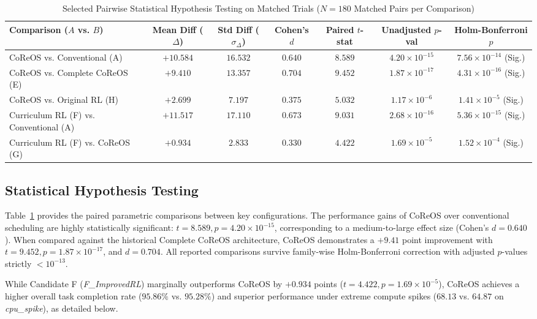 \documentclass[conference]{IEEEtran}
\begin{document}
\begin{table}[!t]
\caption{Selected Pairwise Statistical Hypothesis Testing on Matched Trials ($N=180$ Matched Pairs per Comparison)}
\label{tab:statistical_tests}
\centering
\footnotesize
\begin{tabular}{lcccccc}
\toprule
\textbf{Comparison ($A$ vs. $B$)} & \textbf{Mean Diff ($\Delta$)} & \textbf{Std Diff ($\sigma_\Delta$)} & \textbf{Cohen's $d$} & \textbf{Paired $t$-stat} & \textbf{Unadjusted $p$-val} & \textbf{Holm-Bonferroni $p$} \\
\midrule
CoReOS vs. Conventional (A) & $+10.584$ & $16.532$ & $0.640$ & $8.589$ & $4.20 \times 10^{-15}$ & $7.56 \times 10^{-14}$ (Sig.) \\
CoReOS vs. Complete CoReOS (E) & $+9.410$ & $13.357$ & $0.704$ & $9.452$ & $1.87 \times 10^{-17}$ & $4.31 \times 10^{-16}$ (Sig.) \\
CoReOS vs. Original RL (H) & $+2.699$ & $7.197$ & $0.375$ & $5.032$ & $1.17 \times 10^{-6}$ & $1.41 \times 10^{-5}$ (Sig.) \\
Curriculum RL (F) vs. Conventional (A) & $+11.517$ & $17.110$ & $0.673$ & $9.031$ & $2.68 \times 10^{-16}$ & $5.36 \times 10^{-15}$ (Sig.) \\
Curriculum RL (F) vs. CoReOS (G) & $+0.934$ & $2.833$ & $0.330$ & $4.422$ & $1.69 \times 10^{-5}$ & $1.52 \times 10^{-4}$ (Sig.) \\
\bottomrule
\end{tabular}
\end{table}

\subsection{Statistical Hypothesis Testing}
Table~\ref{tab:statistical_tests} provides the paired parametric comparisons between key configurations. The performance gains of CoReOS over conventional scheduling are highly statistically significant: $t = 8.589, p = 4.20 \times 10^{-15}$, corresponding to a medium-to-large effect size (Cohen's $d = 0.640$). When compared against the historical Complete CoReOS architecture, CoReOS demonstrates a $+9.41$ point improvement with $t = 9.452, p = 1.87 \times 10^{-17}$, and $d = 0.704$. All reported comparisons survive family-wise Holm-Bonferroni correction with adjusted $p$-values strictly $< 10^{-13}$.

While Candidate F (\textit{F\_ImprovedRL}) marginally outperforms CoReOS by $+0.934$ points ($t=4.422, p=1.69 \times 10^{-5}$), CoReOS achieves a higher overall task completion rate ($95.86\%$ vs. $95.28\%$) and superior performance under extreme compute spikes ($68.13$ vs. $64.87$ on \textit{cpu\_spike}), as detailed below.
\end{document}
